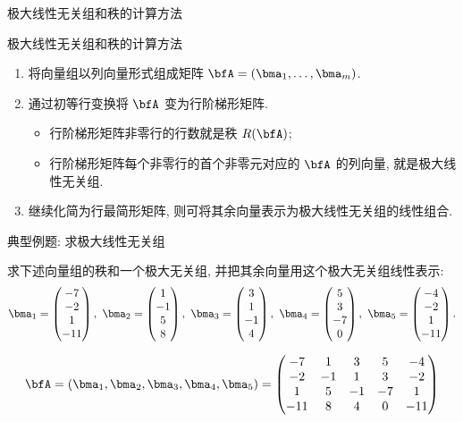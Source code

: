 \begin{frame}{极大线性无关组和秩的计算方法}
	\onslide<+->
	\begin{second}{极大线性无关组和秩的计算方法}
		\begin{enumerate}
			\item 将向量组以列向量形式组成矩阵 $\bfA=(\bma_1,\dots,\bma_m)$.
			\item 通过初等行变换将 $\bfA$ 变为行阶梯形矩阵.
				\begin{itemize}
					\item 行阶梯形矩阵非零行的行数就是秩 $R(\bfA)$;
					\item 行阶梯形矩阵每个非零行的首个非零元对应的 $\bfA$ 的列向量, 就是极大线性无关组.
				\end{itemize}
			\item 继续化简为行最简形矩阵, 则可将其余向量表示为极大线性无关组的线性组合.
		\end{enumerate}
	\end{second}
\end{frame}


\begin{frame}{典型例题: 求极大线性无关组}
	\onslide<+->
	\begin{example}
		求下述向量组的秩和一个极大无关组, 并把其余向量用这个极大无关组线性表示:
		\[\bma_1=\begin{pmatrix}
			-7\\-2\\1\\-11
		\end{pmatrix},\ 
		\bma_2=\begin{pmatrix}
			1\\-1\\5\\8
		\end{pmatrix},\ 
		\bma_3=\begin{pmatrix}
			3\\1\\-1\\4
		\end{pmatrix},\ 
		\bma_4=\begin{pmatrix}
			5\\3\\-7\\0
		\end{pmatrix},\ 
		\bma_5=\begin{pmatrix}
			-4\\-2\\1\\-11
		\end{pmatrix}.
		\]
	\end{example}
	\onslide<+->
	\begin{solution}
		\[\bfA=(\bma_1,\bma_2,\bma_3,\bma_4,\bma_5)
		=\begin{pmatrix}
			-7&1&3&5&-4\\
			-2&-1&1&3&-2\\
			1&5&-1&-7&1\\
			-11&8&4&0&-11
		\end{pmatrix}\]
	\end{solution}
\end{frame}


